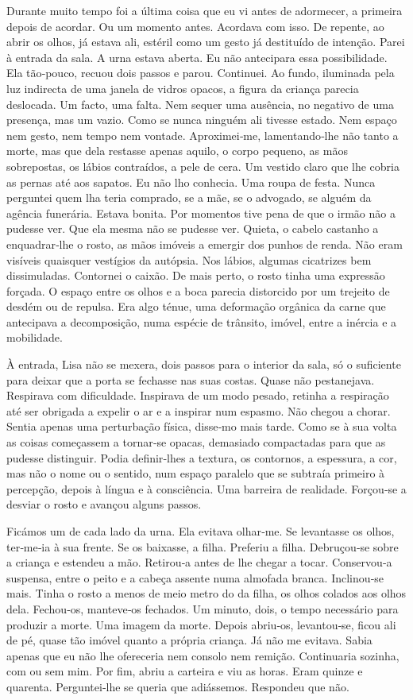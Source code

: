 Durante muito tempo foi a última coisa que eu vi antes de adormecer, a
primeira depois de acordar. Ou um momento antes. Acordava com isso. De
repente, ao abrir os olhos, já estava ali, estéril como um gesto já
destituído de intenção. Parei à entrada da sala. A urna estava aberta.
Eu não antecipara essa possibilidade. Ela tão­‑pouco, recuou dois passos
e parou. Continuei. Ao fundo, iluminada pela luz indirecta de uma janela
de vidros opacos, a figura da criança parecia deslocada. Um facto, uma
falta. Nem sequer uma ausência, no negativo de uma presença, mas um
vazio. Como se nunca ninguém ali tivesse estado. Nem espaço nem gesto,
nem tempo nem vontade. Aproximei­‑me, lamentando­‑lhe não tanto a morte,
mas que dela restasse apenas aquilo, o corpo pequeno, as mãos
sobrepostas, os lábios contraídos, a pele de cera. Um vestido claro que
lhe cobria as pernas até aos sapatos. Eu não lho conhecia. Uma roupa de
festa. Nunca perguntei quem lha teria comprado, se a mãe, se o advogado,
se alguém da agência funerária. Estava bonita. Por momentos tive pena de
que o irmão não a pudesse ver. Que ela mesma não se pudesse ver. Quieta,
o cabelo castanho a enquadrar­‑lhe o rosto, as mãos imóveis a emergir
dos punhos de renda. Não eram visíveis quaisquer vestígios da autópsia.
Nos lábios, algumas cicatrizes bem dissimuladas. Contornei o caixão. De
mais perto, o rosto tinha uma expressão forçada. O espaço entre os olhos
e a boca parecia distorcido por um trejeito de desdém ou de repulsa. Era
algo ténue, uma deformação orgânica da carne que antecipava a
decomposição, numa espécie de trânsito, imóvel, entre a inércia e a
mobilidade.

À entrada, Lisa não se mexera, dois passos para o interior da sala, só o
suficiente para deixar que a porta se fechasse nas suas costas. Quase
não pestanejava. Respirava com dificuldade. Inspirava de um modo pesado,
retinha a respiração até ser obrigada a expelir o ar e a inspirar num
espasmo. Não chegou a chorar. Sentia apenas uma perturbação física,
disse­‑mo mais tarde. Como se à sua volta as coisas começassem a
tornar­‑se opacas, demasiado compactadas para que as pudesse distinguir.
Podia definir­‑lhes a textura, os contornos, a espessura, a cor, mas não
o nome ou o sentido, num espaço paralelo que se subtraía primeiro à
percepção, depois à língua e à consciência. Uma barreira de realidade.
Forçou­‑se a desviar o rosto e avançou alguns passos.

Ficámos um de cada lado da urna. Ela evitava olhar­‑me. Se levantasse os
olhos, ter­‑me­‑ia à sua frente. Se os baixasse, a filha. Preferiu a
filha. Debruçou­‑se sobre a criança e estendeu a mão. Retirou­‑a antes
de lhe chegar a tocar. Conservou­‑a suspensa, entre o peito e a cabeça
assente numa almofada branca. Inclinou­‑se mais. Tinha o rosto a menos
de meio metro do da filha, os olhos colados aos olhos dela. Fechou­‑os,
manteve­‑os fechados. Um minuto, dois, o tempo necessário para produzir
a morte. Uma imagem da morte. Depois abriu­‑os, levantou­‑se, ficou ali
de pé, quase tão imóvel quanto a própria criança. Já não me evitava.
Sabia apenas que eu não lhe ofereceria nem consolo nem remição.
Continuaria sozinha, com ou sem mim. Por fim, abriu a carteira e viu as
horas. Eram quinze e quarenta. Perguntei­‑lhe se queria que adiássemos.
Respondeu que não.

